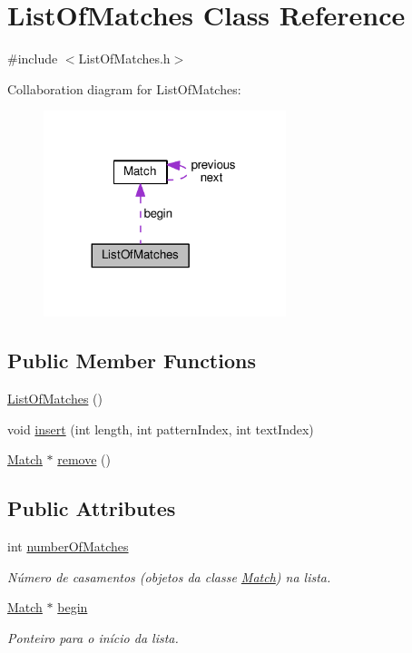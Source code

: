 \hypertarget{classListOfMatches}{\section{List\+Of\+Matches Class Reference}
\label{classListOfMatches}
}


{\ttfamily \#include $<$List\+Of\+Matches.\+h$>$}



Collaboration diagram for List\+Of\+Matches\+:\nopagebreak
\begin{figure}[H]
\begin{center}
\leavevmode
\includegraphics[width=200pt]{classListOfMatches__coll__graph}
\end{center}
\end{figure}
\subsection*{Public Member Functions}
\begin{DoxyCompactItemize}
\item 
\hyperlink{classListOfMatches_a072714a38619e642eda703dfa94fa79c}{List\+Of\+Matches} ()
\item 
void \hyperlink{classListOfMatches_a44472d7bbe64b949bf8ce289bda3134f}{insert} (int length, int pattern\+Index, int text\+Index)
\item 
\hyperlink{classMatch}{Match} $\ast$ \hyperlink{classListOfMatches_a58a6a1649e3731b0e9af20211e4fd03f}{remove} ()
\end{DoxyCompactItemize}
\subsection*{Public Attributes}
\begin{DoxyCompactItemize}
\item 
int \hyperlink{classListOfMatches_ab5b4c972df3758bed3fd5ace4d78a4c8}{number\+Of\+Matches}
\begin{DoxyCompactList}\small\item\em Número de casamentos (objetos da classe \hyperlink{classMatch}{Match}) na lista. \end{DoxyCompactList}\item 
\hyperlink{classMatch}{Match} $\ast$ \hyperlink{classListOfMatches_adc4925222fa338afdbbcdd7e5c37e2c9}{begin}
\begin{DoxyCompactList}\small\item\em Ponteiro para o início da lista. \end{DoxyCompactList}\end{DoxyCompactItemize}


